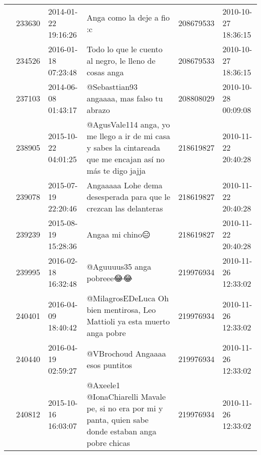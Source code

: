 \begin{tabular}{llllrl}
           & 233630  & 2014-01-22 19:16:26 &                                                                                                                   Anga como la deje a fio :c &   208679533 & 2010-10-27 18:36:15 \\
           & 234526  & 2016-01-18 07:23:48 &                                                                                       Todo lo que le cuento al negro, le lleno de cosas anga &   208679533 & 2010-10-27 18:36:15 \\
           & 237103  & 2014-06-08 01:43:17 &                                                                                                   @Sebasttian93 angaaaa, mas falso tu abrazo &   208808029 & 2010-10-28 00:09:08 \\
           & 238905  & 2015-10-22 04:01:25 &                                 @AgusVale114 anga, yo me llego a ir de mi casa y sabes la cintareada que me encajan así no más te digo jajja &   218619827 & 2010-11-22 20:40:28 \\
           & 239078  & 2015-07-19 22:20:46 &                                                                            Angaaaaa Lohe dema desesperada para que le crezcan las delanteras &   218619827 & 2010-11-22 20:40:28 \\
           & 239239  & 2015-08-19 15:28:36 &                                                                                                                              Angaa mi chino😑 &   218619827 & 2010-11-22 20:40:28 \\
           & 239995  & 2016-02-18 16:32:48 &                                                                                                                    @Aguuuus35 anga pobreee😂😂 &   219976934 & 2010-11-26 12:33:02 \\
           & 240401  & 2016-04-09 18:40:42 &                                                                   @MilagrosEDeLuca Oh bien mentirosa, Leo Mattioli ya esta muerto anga pobre &   219976934 & 2010-11-26 12:33:02 \\
           & 240440  & 2016-04-19 02:59:27 &                                                                                                             @VBrochoud Angaaaa esos puntitos &   219976934 & 2010-11-26 12:33:02 \\
           & 240812  & 2015-10-16 16:03:07 &                                      @Axeele1 @IonaChiarelli Mavale pe, si no era por mi y panta, quien sabe donde estaban anga pobre chicas &   219976934 & 2010-11-26 12:33:02 \\

\end{tabular}
